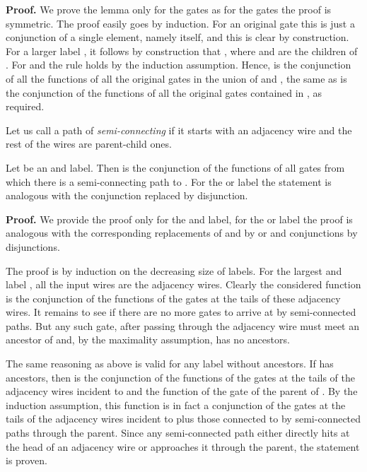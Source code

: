 \documentclass{llncs}
\begin{document}
{\bf Proof.} 
We prove the lemma only for the  gates as for the  gates the proof is symmetric.
The proof easily goes by induction. For an original gate this is just a conjunction of a single element, namely itself, and 
this is clear by construction. For a larger label , it follows by construction that , where  and  are the children of . For  and  the
rule holds by the induction assumption. Hence,  is the conjunction of all the functions of all the original gates in the union of  and , the same as  is the conjunction of the functions of all the original gates contained in , as required.


Let us call a path of  \emph{semi-connecting} if it starts with an adjacency wire and the rest of the wires are parent-child ones.

\begin{lemma} \label{semiconnect}
Let  be an {\sc and} label. Then  is the conjunction of the functions of all gates from which there is a semi-connecting path to .
For the {\sc or} label the statement is analogous with the conjunction replaced by disjunction.
\end{lemma}

{\bf Proof.} 
We provide the proof only for the {\sc and} label, for the {\sc or} label
the proof is analogous with the corresponding replacements of {\sc and} by {\sc or} and conjunctions by disjunctions.

The proof is by induction on the decreasing size 
of labels. For the largest {\sc and} label , all the input wires are the adjacency wires. Clearly the considered function is the conjunction of the functions of the gates at the tails of these adjacency wires. It remains to see if there are no more gates to arrive at  by semi-connected paths. But any such gate, after passing through the adjacency wire must meet an ancestor of  and, by the maximality assumption,  has
no ancestors.

The same reasoning as above is valid for any label  without ancestors. If  has ancestors, then 
is the conjunction of the functions of the gates at the tails
of the adjacency wires incident to  and the function of the  gate of the parent of  . By the induction assumption, this function is in fact a conjunction of the gates at the tails of the adjacency wires incident to  plus those connected to  by semi-connected paths through the parent. Since any semi-connected path either directly hits  at the head of an adjacency wire or approaches it through the parent, the statement is proven. 
\end{document}
